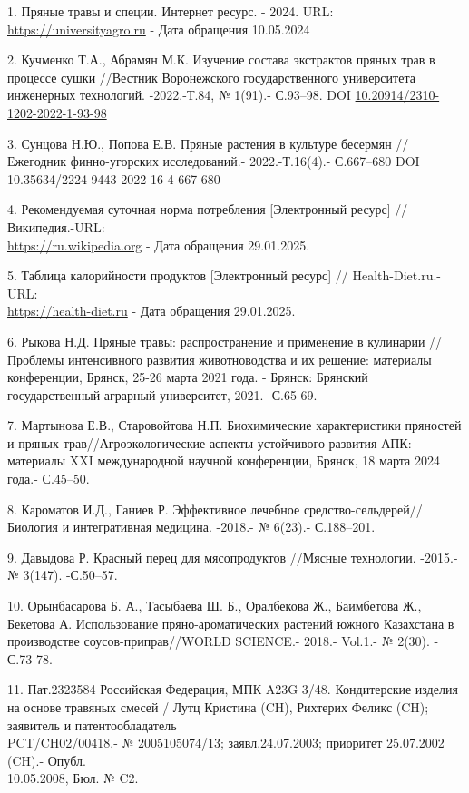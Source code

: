 \begin{references}
1. Пряные травы и специи. Интернет ресурс. - 2024.
URL: \href{https://universityagro.ru/овощеводство/пряные-травы-и-специи/?ysclid=lw61pt05hp351265197}{https://universityagro.ru} - Дата обращения
10.05.2024

2. Кучменко Т.А., Абрамян М.К. Изучение состава экстрактов пряных трав в
процессе сушки //Вестник Воронежского государственного университета
инженерных технологий. -2022.-Т.84, № 1(91).- С.93--98. DOI
\href{http://doi.org/10.20914/2310-1202-2022-1-93-98}{10.20914/2310-1202-2022-1-93-98}

3. Сунцова Н.Ю., Попова Е.В. Пряные растения в культуре бесермян //
Ежегодник финно-угорских исследований.- 2022.-Т.16(4).- С.667--680 DOI
10.35634/2224-9443-2022-16-4-667-680

4. Рекомендуемая суточная норма потребления {[}Электронный
ресурс{]} // Википедия.-URL:\\
\href{https://ru.wikipedia.org/wiki/Рекомендуемая\_суточная\_норма\_потребления}{https://ru.wikipedia.org} -
Дата обращения 29.01.2025.

5. Таблица калорийности продуктов {[}Электронный
ресурс{]} // Health-Diet.ru.- URL:\\
\href{https://health-diet.ru/table_calorie_users/2314523/}{https://health-diet.ru} - Дата
обращения 29.01.2025.

6. Рыкова Н.Д. Пряные травы: распространение и применение в кулинарии
//Проблемы интенсивного развития животноводства и их решение: материалы
конференции, Брянск, 25-26 марта 2021 года. - Брянск: Брянский
государственный аграрный университет, 2021. -С.65-69.

7. Мартынова Е.В., Старовойтова Н.П. Биохимические характеристики
пряностей и пряных трав//Агроэкологические аспекты устойчивого развития
АПК: материалы XXI международной научной конференции, Брянск, 18 марта
2024 года.- С.45--50.

8. Кароматов И.Д., Ганиев Р. Эффективное лечебное
средство-сельдерей//Биология и интегративная медицина. -2018.- № 6(23).-
С.188--201.

9. Давыдова Р. Красный перец для мясопродуктов //Мясные технологии.
-2015.- № 3(147). -С.50--57.

10. Орынбасарова Б. А., Тасыбаева Ш. Б., Оралбекова Ж., Баимбетова Ж.,
Бекетова А. Использование пряно-ароматических растений южного Казахстана
в производстве соусов-приправ//WORLD SCIENCE.- 2018.- Vol.1.- № 2(30). -
С.73-78.

11. Пат.2323584 Российская Федерация, МПК A23G 3/48. Кондитерские
изделия на основе травяных смесей / Лутц Кристина (CH), Рихтерих Феликс
(CH); заявитель и патентообладатель \\PCT/CH02/00418.- № 2005105074/13;
заявл.24.07.2003; приоритет 25.07.2002 (CH).- Опубл. \\10.05.2008, Бюл. №
C2.


\end{references}
